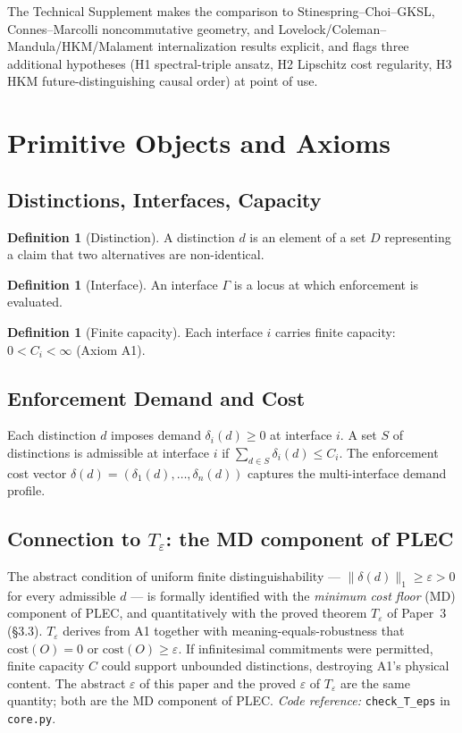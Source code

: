 \documentclass[11pt]{article}
\newcommand{\coderef}[2]{\smallskip\noindent\textit{Code reference:} \texttt{#1} in \texttt{#2}.}
\theoremstyle{definition}
\newtheorem{definition}[theorem]{Definition}
\begin{document}
\begin{tcolorbox}[apfbox, title={Operational primitives: where each term is defined and used}]
\noindent The Technical Supplement makes the comparison to Stinespring--Choi--GKSL, Connes--Marcolli noncommutative geometry, and Lovelock/Coleman--Mandula/HKM/Malament internalization results explicit, and flags three additional hypotheses (H1 spectral-triple ansatz, H2 Lipschitz cost regularity, H3 HKM future-distinguishing causal order) at point of use.
\end{tcolorbox}

\section{Primitive Objects and Axioms}\label{sec:primitives}

\subsection{Distinctions, Interfaces, Capacity}
\begin{definition}[Distinction]
A distinction $d$ is an element of a set $D$ representing a claim that two alternatives are non-identical.
\end{definition}

\begin{definition}[Interface]
An interface $\Gamma$ is a locus at which enforcement is evaluated.
\end{definition}

\begin{definition}[Finite capacity]
Each interface $i$ carries finite capacity: $0 < C_i < \infty$ (Axiom A1).
\end{definition}

\subsection{Enforcement Demand and Cost}
Each distinction $d$ imposes demand $\delta_i(d) \ge 0$ at interface $i$.  A set $S$ of distinctions is admissible at interface $i$ if $\sum_{d \in S} \delta_i(d) \le C_i$.  The enforcement cost vector $\delta(d) = (\delta_1(d), \ldots, \delta_n(d))$ captures the multi-interface demand profile.

\subsection{Connection to $T_\varepsilon$: the MD component of PLEC}\label{subsec:Teps}
The abstract condition of uniform finite distinguishability --- $\|\delta(d)\|_1 \ge \varepsilon > 0$ for every admissible $d$ --- is formally identified with the \emph{minimum cost floor} (MD) component of PLEC, and quantitatively with the proved theorem $T_\varepsilon$ of Paper~3 (\S 3.3).  $T_\varepsilon$ derives from A1 together with meaning-equals-robustness that $\mathrm{cost}(O) = 0$ or $\mathrm{cost}(O) \ge \varepsilon$.  If infinitesimal commitments were permitted, finite capacity $C$ could support unbounded distinctions, destroying A1's physical content.  The abstract $\varepsilon$ of this paper and the proved $\varepsilon$ of $T_\varepsilon$ are the same quantity; both are the MD component of PLEC.
\coderef{check\_T\_eps}{core.py}
\end{document}
